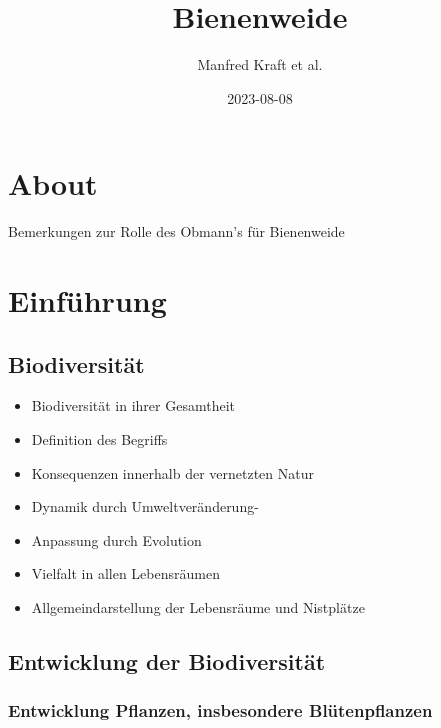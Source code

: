 \documentclass[
]{book}
\title{Bienenweide}
\author{Manfred Kraft et al.}
\date{2023-08-08}
\providecommand{\tightlist}{%
  \setlength{\itemsep}{0pt}\setlength{\parskip}{0pt}}
\begin{document}
\maketitle

{
\setcounter{tocdepth}{1}
\tableofcontents
}
\hypertarget{about}{%
\chapter{About}\label{about}}

Bemerkungen zur Rolle des Obmann's für Bienenweide

\hypertarget{einfuxfchrung}{%
\chapter{Einführung}\label{einfuxfchrung}}

\hypertarget{biodiversituxe4t}{%
\section{Biodiversität}\label{biodiversituxe4t}}

\begin{itemize}
\tightlist
\item
  Biodiversität in ihrer Gesamtheit
\item
  Definition des Begriffs
\item
  Konsequenzen innerhalb der vernetzten Natur
\item
  Dynamik durch Umweltveränderung-
\item
  Anpassung durch Evolution
\item
  Vielfalt in allen Lebensräumen
\item
  Allgemeindarstellung der Lebensräume und Nistplätze
\end{itemize}

\hypertarget{entwicklung-der-biodiversituxe4t}{%
\section{Entwicklung der Biodiversität}\label{entwicklung-der-biodiversituxe4t}}

\hypertarget{entwicklung-pflanzen-insbesondere-bluxfctenpflanzen}{%
\subsection{Entwicklung Pflanzen, insbesondere Blütenpflanzen}\label{entwicklung-pflanzen-insbesondere-bluxfctenpflanzen}}
\end{document}
